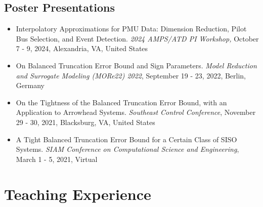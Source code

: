 \documentclass[10pt,a4paper,sans]{moderncv}        %
\begin{document}
\subsection{Poster Presentations}
\vspace{5pt}
\begin{itemize}
    \item Interpolatory Approximations for PMU Data: Dimension Reduction, Pilot Bus Selection, and Event Detection. \textit{2024 AMPS/ATD PI Workshop,} October 7 - 9, 2024, Alexandria, VA, United States
        \vspace{2pt}
    \item On Balanced Truncation Error Bound and Sign Parameters. \textit{Model Reduction and Surrogate Modeling (MORe22) 2022}, September 19 - 23, 2022, Berlin, Germany
        \vspace{2pt}
    \item On the Tightness of the Balanced Truncation Error Bound, with an Application to Arrowhead Systems. \textit{Southeast Control Conference}, November 29 - 30, 2021, Blacksburg, VA, United States
        \vspace{2pt}
    \item A Tight Balanced Truncation Error Bound for a Certain Class of SISO Systems. \textit{SIAM Conference on Computational Science and Engineering}, March 1 - 5, 2021, Virtual
\end{itemize}

\section{Teaching Experience}

\vspace{5pt}
\end{document}
